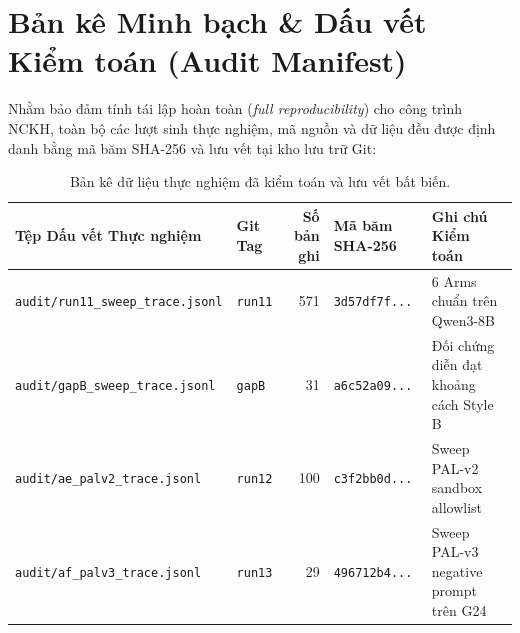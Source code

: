 \documentclass[11pt,a4paper]{report}
\begin{document}
\newpage

\chapter{Bản kê Minh bạch \& Dấu vết Kiểm toán (Audit Manifest)}

Nhằm bảo đảm tính tái lập hoàn toàn (\textit{full reproducibility}) cho công trình NCKH, toàn bộ các lượt sinh thực nghiệm, mã nguồn và dữ liệu đều được định danh bằng mã băm SHA-256 và lưu vết tại kho lưu trữ Git:

\begin{table}[h!]
\centering\small
\begin{tabularx}{\textwidth}{llrXl}
\toprule
\textbf{Tệp Dấu vết Thực nghiệm} & \textbf{Git Tag} & \textbf{Số bản ghi} & \textbf{Mã băm SHA-256} & \textbf{Ghi chú Kiểm toán} \\
\midrule
\texttt{audit/run11\_sweep\_trace.jsonl} & \texttt{run11} & 571 & \texttt{3d57df7f...} & 6 Arms chuẩn trên Qwen3-8B \\
\texttt{audit/gapB\_sweep\_trace.jsonl} & \texttt{gapB} & 31 & \texttt{a6c52a09...} & Đối chứng diễn đạt khoảng cách Style B \\
\texttt{audit/ae\_palv2\_trace.jsonl} & \texttt{run12} & 100 & \texttt{c3f2bb0d...} & Sweep PAL-v2 sandbox allowlist \\
\texttt{audit/af\_palv3\_trace.jsonl} & \texttt{run13} & 29 & \texttt{496712b4...} & Sweep PAL-v3 negative prompt trên G24 \\
\bottomrule
\end{tabularx}
\caption{Bản kê dữ liệu thực nghiệm đã kiểm toán và lưu vết bất biến.}
\end{table}
\end{document}
